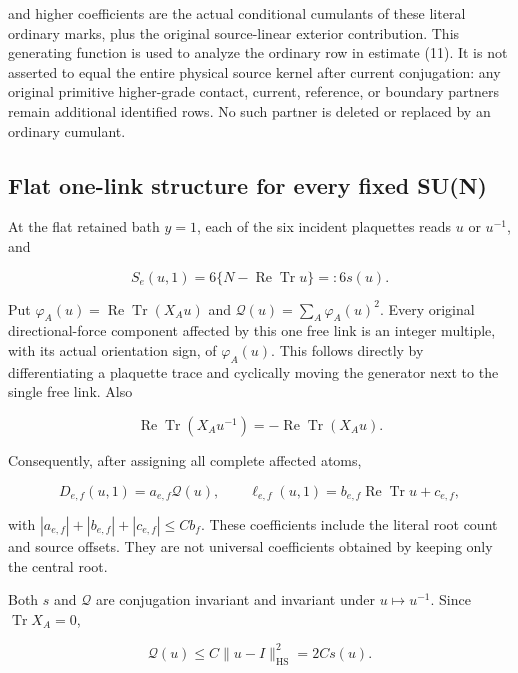\documentclass[
  11pt,
]{article}
\begin{document}
and higher coefficients are the actual conditional cumulants of these
literal ordinary marks, plus the original source-linear exterior
contribution. This generating function is used to analyze the ordinary
row in estimate (11). It is not asserted to equal the entire physical
source kernel after current conjugation: any original primitive
higher-grade contact, current, reference, or boundary partners remain
additional identified rows. No such partner is deleted or replaced by an
ordinary cumulant.

\hypertarget{flat-one-link-structure-for-every-fixed-sun}{%
\subsection{Flat one-link structure for every fixed
SU(N)}\label{flat-one-link-structure-for-every-fixed-sun}}

At the flat retained bath \(y=1\), each of the six incident plaquettes
reads \(u\) or \(u^{-1}\), and

\[
 S_e(u,1)=6\{N-\operatorname{Re}\operatorname{Tr}u\}=:6s(u).
                                                        \tag{9}
\]

Put \(\varphi_A(u)=\operatorname{Re}\operatorname{Tr}(X_Au)\) and
\(\mathcal Q(u)=\sum_A\varphi_A(u)^2\). Every original directional-force
component affected by this one free link is an integer multiple, with
its actual orientation sign, of \(\varphi_A(u)\). This follows directly
by differentiating a plaquette trace and cyclically moving the generator
next to the single free link. Also

\[
 \operatorname{Re}\operatorname{Tr}(X_Au^{-1})
 =-\operatorname{Re}\operatorname{Tr}(X_Au).
\]

Consequently, after assigning all complete affected atoms,

\[
 D_{e,f}(u,1)=a_{e,f}\mathcal Q(u),
 \qquad
 \ell_{e,f}(u,1)=b_{e,f}\operatorname{Re}\operatorname{Tr}u+c_{e,f},
                                                        \tag{10}
\]

with \(|a_{e,f}|+|b_{e,f}|+|c_{e,f}|\le Cb_f\). These coefficients
include the literal root count and source offsets. They are not
universal coefficients obtained by keeping only the central root.

Both \(s\) and \(\mathcal Q\) are conjugation invariant and invariant
under \(u\mapsto u^{-1}\). Since \(\operatorname{Tr}X_A=0\),

\[
 \mathcal Q(u)\le C\|u-I\|_{\mathrm{HS}}^2=2Cs(u).
                                                        \tag{11}
\]
\end{document}
